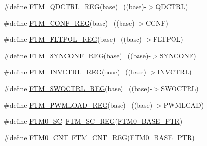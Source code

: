 \begin{DoxyCompactItemize}
\item 
\#define \hyperlink{group___f_t_m___register___accessor___macros_ga998d62e98f702aca0c1f71e7699d5973}{F\+T\+M\+\_\+\+Q\+D\+C\+T\+R\+L\+\_\+\+R\+EG}(base)                                      ~((base)-\/$>$Q\+D\+C\+T\+RL)
\item 
\#define \hyperlink{group___f_t_m___register___accessor___macros_gaccd05c478b64606ec1ceb2ef17e38dc4}{F\+T\+M\+\_\+\+C\+O\+N\+F\+\_\+\+R\+EG}(base)                                          ~((base)-\/$>$C\+O\+NF)
\item 
\#define \hyperlink{group___f_t_m___register___accessor___macros_ga031ade84211f87bed77fb3b71dfa67e6}{F\+T\+M\+\_\+\+F\+L\+T\+P\+O\+L\+\_\+\+R\+EG}(base)                                      ~((base)-\/$>$F\+L\+T\+P\+OL)
\item 
\#define \hyperlink{group___f_t_m___register___accessor___macros_gab945eb614e7150c2e0048fb7b684ebad}{F\+T\+M\+\_\+\+S\+Y\+N\+C\+O\+N\+F\+\_\+\+R\+EG}(base)                                    ~((base)-\/$>$S\+Y\+N\+C\+O\+NF)
\item 
\#define \hyperlink{group___f_t_m___register___accessor___macros_gaa802450fbaa2dc424ffe4838d5c9a89b}{F\+T\+M\+\_\+\+I\+N\+V\+C\+T\+R\+L\+\_\+\+R\+EG}(base)                                    ~((base)-\/$>$I\+N\+V\+C\+T\+RL)
\item 
\#define \hyperlink{group___f_t_m___register___accessor___macros_ga9d8f5821b8f521665946f61a878a3963}{F\+T\+M\+\_\+\+S\+W\+O\+C\+T\+R\+L\+\_\+\+R\+EG}(base)                                    ~((base)-\/$>$S\+W\+O\+C\+T\+RL)
\item 
\#define \hyperlink{group___f_t_m___register___accessor___macros_ga2788d558fe351bdcafa92b44f8611c03}{F\+T\+M\+\_\+\+P\+W\+M\+L\+O\+A\+D\+\_\+\+R\+EG}(base)                                    ~((base)-\/$>$P\+W\+M\+L\+O\+AD)
\item 
\#define \hyperlink{group___f_t_m___register___accessor___macros_gaa8cb4b7bcccc202d9256a35e2557c359}{F\+T\+M0\+\_\+\+SC}~\hyperlink{group___f_t_m___register___accessor___macros_ga0b48df6cbccecf754cc49bb7ea1e3aad}{F\+T\+M\+\_\+\+S\+C\+\_\+\+R\+EG}(\hyperlink{group___f_t_m___peripheral_gae712c29b7abcf338d8f8f6418683fa66}{F\+T\+M0\+\_\+\+B\+A\+S\+E\+\_\+\+P\+TR})
\item 
\#define \hyperlink{group___f_t_m___register___accessor___macros_ga8049141666e13721ffe63b8211198740}{F\+T\+M0\+\_\+\+C\+NT}~\hyperlink{group___f_t_m___register___accessor___macros_ga1ba1654f76ecc24de48047117cb5b45e}{F\+T\+M\+\_\+\+C\+N\+T\+\_\+\+R\+EG}(\hyperlink{group___f_t_m___peripheral_gae712c29b7abcf338d8f8f6418683fa66}{F\+T\+M0\+\_\+\+B\+A\+S\+E\+\_\+\+P\+TR})

\end{DoxyCompactItemize}
